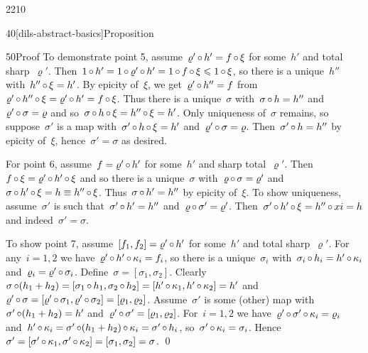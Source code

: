 \begin{parsec}{2210}
\begin{point}{40}[dils-abstract-basics]{Proposition}
\begin{point}{50}{Proof}
To demonstrate point 5, assume~$\varrho' \mathop{\circ} h' = f \mathop{\circ} \xi$
    for some~$h'$ and total sharp~$\varrho'$.
    Then~$1 \mathop{\circ} h' = 1 \mathop{\circ} \varrho' \mathop{\circ} h'
                    = 1 \mathop{\circ} f \mathop{\circ} \xi \leqslant 1 \mathop{\circ} \xi$,
                    so there is a unique~$h''$
                    with~$h'' \mathop{\circ} \xi = h'$.
By epicity of~$\xi$,
    we get~$\varrho'\mathop{\circ} h'' = f$
    from~$\varrho' \mathop{\circ} h'' \mathop{\circ} \xi = \varrho' \mathop{\circ} h' = f \mathop{\circ} \xi$.
Thus there is a unique~$\sigma$
    with~$\sigma \mathop{\circ} h = h''$ and~$\varrho' \mathop{\circ} \sigma = \varrho$
    and so~$\sigma \mathop{\circ} h \mathop{\circ} \xi = h'' \mathop{\circ} \xi = h'$.
Only uniqueness of~$\sigma$ remains,
    so suppose~$\sigma'$ is a map with~$\sigma'\mathop{\circ} h \mathop{\circ} \xi = h'$
            and~$\varrho' \mathop{\circ} \sigma = \varrho$.
    Then~$\sigma' \mathop{\circ} h = h''$ by epicity of~$\xi$,
    hence~$\sigma'=\sigma$ as desired.

For point 6, assume~$f  = \varrho' \mathop{\circ} h'$
    for some~$h'$ and sharp total~$\varrho'$.
    Then~$f \mathop{\circ} \xi = \varrho' \mathop{\circ} h' \mathop{\circ} \xi $
    and so there is a unique~$\sigma$
    with~$\varrho \mathop{\circ} \sigma = \varrho'$
    and~$\sigma \mathop{\circ} h' \mathop{\circ} \xi = h \equiv h'' \mathop{\circ} \xi$.
    Thus~$\sigma \mathop{\circ} h' = h''$ by epicity of~$\xi$.
To show uniqueness,
    assume~$\sigma'$ is such that~$\sigma' \mathop{\circ} h' = h''$
    and~$\varrho \mathop{\circ} \sigma' = \varrho'$.
    Then~$\sigma' \mathop{\circ} h' \mathop{\circ} \xi = h'' \mathop{\circ} xi = h$
    and indeed~$\sigma' = \sigma$.

To show point 7, assume~$[f_1,f_2] = \varrho'\mathop{\circ} h'$
    for some~$h'$ and total sharp~$\varrho'$.
For any~$i=1,2$
    we have~$\varrho' \mathop{\circ} h' \mathop{\circ} \kappa_i = f_i$,
    so there is a unique~$\sigma_i$
    with~$\sigma_i \mathop{\circ} h_i = h' \mathop{\circ} \kappa_i$
    and~$\varrho_i = \varrho' \mathop{\circ} \sigma_i$.
Define~$\sigma = [\sigma_1, \sigma_2]$.
Clearly~$\sigma \mathop{\circ} (h_1 + h_2)
    = [\sigma_1 \mathop{\circ} h_1,\sigma_2 \mathop{\circ} h_2]
    = [ h' \mathop{\circ} \kappa_1,  h'\mathop{\circ} \kappa_2] = h'$
    and~$\varrho' \mathop{\circ} \sigma
            = [\varrho' \mathop{\circ} \sigma_1, \varrho' \mathop{\circ} \sigma_2]
            = [\varrho_1, \varrho_2]$.
Assume~$\sigma'$ is some (other) map with~$\sigma' \mathop{\circ} (h_1 + h_2) = h'$
    and~$\varrho' \mathop{\circ} \sigma' = [\varrho_1, \varrho_2]$.
For~$i=1,2$
    we have~$\varrho' \mathop{\circ} \sigma' \mathop{\circ} \kappa_i = \varrho_i$
    and~$h' \mathop{\circ} \kappa_i = \sigma' \mathop{\circ} (h_1 + h_2) \mathop{\circ} \kappa_i
                =  \sigma' \mathop{\circ} h_i$,
                so~$\sigma' \mathop{\circ} \kappa_i = \sigma_i$.
    Hence~$\sigma' = [\sigma' \mathop{\circ} \kappa_1, 
                \sigma' \mathop{\circ} \kappa_2] = [\sigma_1,\sigma_2] = \sigma$.
                \qed
\end{point}
\end{point}
\end{parsec}

